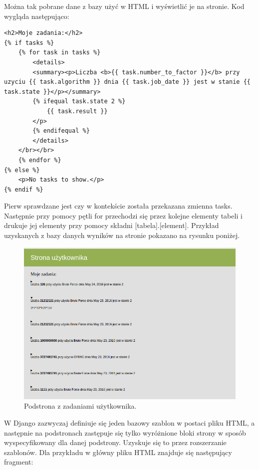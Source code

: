 \documentclass{article}
\begin{document}
Można tak pobrane dane z bazy użyć w HTML i wyświetlić je na stronie. Kod wygląda następująco:

\begin{lstlisting}
<h2>Moje zadania:</h2>
{% if tasks %}
    {% for task in tasks %}
        <details>
        <summary><p>Liczba <b>{{ task.number_to_factor }}</b> przy uzyciu {{ task.algorithm }} dnia {{ task.job_date }} jest w stanie {{ task.state }}</p></summary>
        {% ifequal task.state 2 %}         
            {{ task.result }}
        </p>
        {% endifequal %}
        </details>
    </br></br>  
    {% endfor %}  
{% else %}
    <p>No tasks to show.</p>
{% endif %}
\end{lstlisting}

Pierw sprawdzane jest czy w kontekście została przekazana zmienna tasks. Następnie przy pomocy pętli for przechodzi się przez kolejne elementy tabeli i drukuje jej elementy przy pomocy składni [tabela].[element]. Przykład uzyskanych z bazy danych wyników na stronie pokazano na rysunku poniżej.

\begin{figure}[h!]
    \includegraphics[width=\linewidth]{userpage.png}
    \caption{Podstrona z zadaniami użytkownika.}
    \label{fig:userpagescr}
\end{figure}

W Django zazwyczaj definiuje się jeden bazowy szablon w postaci pliku HTML, a następnie na podstronach zastępuje się tylko wyróżnione bloki strony w sposób wyspecyfikowany dla danej podstrony. Uzyskuje się to przez rozszerzanie szablonów. Dla przykładu w główny pliku HTML znajduje się następujący fragment:
\end{document}
